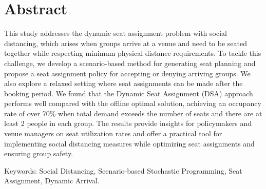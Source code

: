 
\section*{Abstract}

This study addresses the dynamic seat assignment problem with social distancing, which arises when groups arrive at a venue and need to be seated together while respecting minimum physical distance requirements. To tackle this challenge, we develop a scenario-based method for generating seat planning and propose a seat assignment policy for accepting or denying arriving groups. We also explore a relaxed setting where seat assignments can be made after the booking period. We found that the Dynamic Seat Assignment (DSA) approach performs well compared with the offline optimal solution, achieving an occupancy rate of over 70\% when total demand exceeds the number of seats and there are at least 2 people in each group. The results provide insights for policymakers and venue managers on seat utilization rates and offer a practical tool for implementing social distancing measures while optimizing seat assignments and ensuring group safety.


Keywords: Social Distancing, Scenario-based Stochastic Programming, Seat Assignment, Dynamic Arrival.

